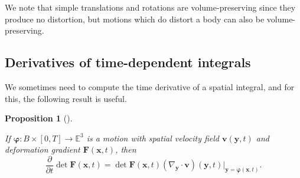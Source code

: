 \documentclass[
  letterpaper,
  DIV=11,
  numbers=noendperiod]{scrreprt}
\theoremstyle{plain}
\newtheorem{proposition}{Proposition}[chapter]
\theoremstyle{remark}
\begin{document}
We note that simple translations and rotations are volume-preserving
since they produce no distortion, but motions which do distort a body
can also be volume-preserving.

\subsection{Derivatives of time-dependent
integrals}\label{derivatives-of-time-dependent-integrals}

We sometimes need to compute the time derivative of a spatial integral,
and for this, the following result is useful.

\begin{proposition}[]\protect\hypertarget{prp-TotalDerivativeDetF}{}\label{prp-TotalDerivativeDetF}

If \({\boldsymbol{\varphi}}:B\times [0,T]\to{\mathbb{E}}^3\) is a motion
with spatial velocity field \({\boldsymbol{v}}({\boldsymbol{y}},t)\) and
deformation gradient \({\boldsymbol{F}}({\boldsymbol{x}},t)\), then
\[\frac{\partial}{\partial t}\det{\boldsymbol{F}}({\boldsymbol{x}},t) = \det{\boldsymbol{F}}({\boldsymbol{x}},t)(\nabla_{\boldsymbol{y}}\cdot{\boldsymbol{v}})({\boldsymbol{y}},t)\bigg|_{{\boldsymbol{y}}={\boldsymbol{\varphi}}({\boldsymbol{x}},t)}.\]

\end{proposition}
\end{document}
